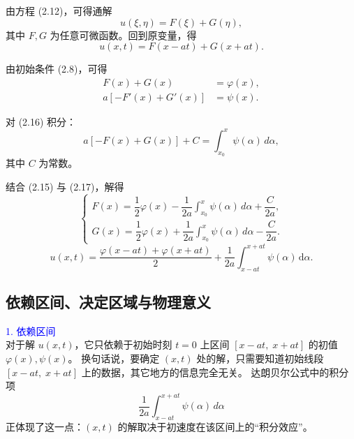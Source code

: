 \begin{proposition}[经过变量替换后的公式]
    由方程 (2.12)，可得通解
\begin{equation}
    u(\xi,\eta) = F(\xi) + G(\eta),
    \tag{2.13}
\end{equation}
其中 $F,G$ 为任意可微函数。回到原变量，得
\begin{equation}
    u(x,t) = F(x-at) + G(x+at).
    \tag{2.14}
\end{equation}

由初始条件 (2.8)，可得
\begin{align}
    F(x) + G(x) &= \varphi(x), \tag{2.15}\\
    a[-F'(x)+G'(x)] &= \psi(x). \tag{2.16}
\end{align}

对 (2.16) 积分：
\begin{equation}
    a[-F(x)+G(x)] + C = \int_{x_0}^x \psi(\alpha)\, d\alpha,
    \tag{2.17}
\end{equation}
其中 $C$ 为常数。

结合 (2.15) 与 (2.17)，解得
\begin{equation}
\begin{cases}
    F(x) = \dfrac{1}{2}\varphi(x) - \dfrac{1}{2a}\displaystyle\int_{x_0}^x \psi(\alpha)\, d\alpha + \dfrac{C}{2a}, \\[1.2em]
    G(x) = \dfrac{1}{2}\varphi(x) + \dfrac{1}{2a}\displaystyle\int_{x_0}^x \psi(\alpha)\, d\alpha - \dfrac{C}{2a}.
\end{cases}
\tag{2.18}
\end{equation}
 \begin{equation}
u(x,t) = \frac{\varphi(x - at) + \varphi(x + at)}{2}
+ \frac{1}{2a} \int_{x - at}^{x + at} \psi(\alpha)\, \mathrm{d}\alpha.
\tag{2.19}
\end{equation}

\end{proposition}

\subsection*{依赖区间、决定区域与物理意义}

\textcolor{blue}{1. 依赖区间}\\ 
对于解 $u(x,t)$，它只依赖于初始时刻 $t=0$ 上区间 $[x-at,\;x+at]$ 的初值 $\varphi(x),\psi(x)$。  
换句话说，要确定 $(x,t)$ 处的解，只需要知道初始线段 $[x-at,\;x+at]$ 上的数据，其它地方的信息完全无关。  
达朗贝尔公式中的积分项
\[
\frac{1}{2a}\int_{x-at}^{x+at}\psi(\alpha)\,d\alpha
\]
正体现了这一点：$(x,t)$ 的解取决于初速度在该区间上的“积分效应”。

